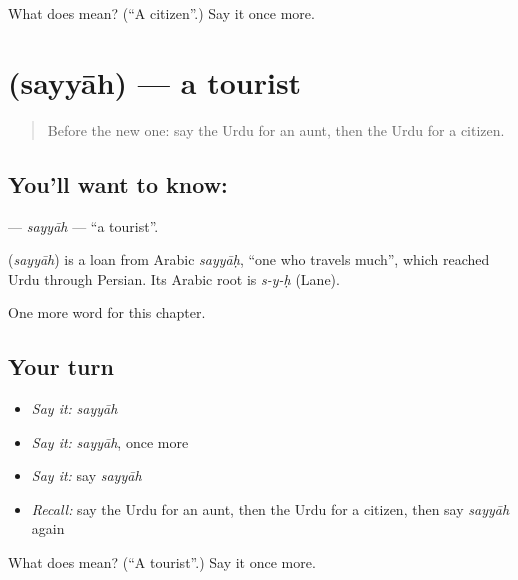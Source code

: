 \begin{tcolorbox}[breakable,colback=teal!4,colframe=teal!35!black,title={Before you move on}]
What does  mean? (\textquotedblleft{}A citizen\textquotedblright{}.) Say it once more.
\end{tcolorbox}
\section[\texorpdfstring{\ur{سیاح} (sayyāh)}{سیاح (sayyāh)}]{ (sayyāh) — a tourist}

\label{lesson:UR-C171-sayyah}



\begin{quote}
Before the new one: say the Urdu for an aunt, then the Urdu for a citizen.
\end{quote}

\subsection*{You'll want to know: }
\textbf{} — \emph{sayyāh} — \textquotedblleft{}a tourist\textquotedblright{}.

\begin{cousinweb}
\textbf{} (\emph{sayyāh}) is a loan from Arabic \emph{sayyāḥ}, \textquotedblleft{}one who travels much\textquotedblright{}, which reached Urdu through Persian. Its Arabic root is \emph{s-y-ḥ} (Lane).
\end{cousinweb}

\begin{grammarlens}[title={What you've built}]
One more word for this chapter.
\end{grammarlens}

\subsection*{Your turn}
\begin{itemize}
\raggedright
  \item \emph{Say it:} \emph{sayyāh}
  \item \emph{Say it:} \emph{sayyāh}, once more
  \item \emph{Say it:} say \emph{sayyāh}
  \item \emph{Recall:} say the Urdu for an aunt, then the Urdu for a citizen, then say \emph{sayyāh} again
\end{itemize}

\begin{tcolorbox}[breakable,colback=teal!4,colframe=teal!35!black,title={Before you move on}]
What does  mean? (\textquotedblleft{}A tourist\textquotedblright{}.) Say it once more.
\end{tcolorbox}
